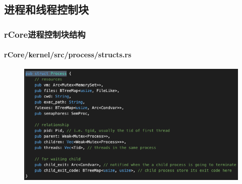 \subsection{进程和线程控制块} %
\begin{frame}[fragile]
    \frametitle{rCore进程控制块结构}
    \framesubtitle{rCore/kernel/src/process/structs.rs}
    \begin{figure}
    \includegraphics[width=0.8\linewidth]{figs/process.png}
    \end{figure}
\end{frame}
% 
% 
% 
% 
% 
